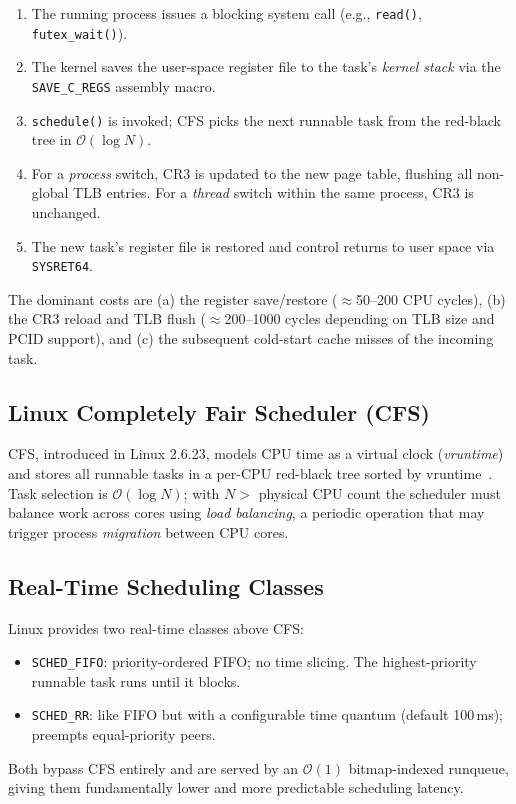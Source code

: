 \documentclass[conference]{IEEEtran}
\begin{document}
\begin{enumerate}
  \item The running process issues a blocking system call
        (e.g., \texttt{read()}, \texttt{futex\_wait()}).
  \item The kernel saves the user-space register file to the
        task's \emph{kernel stack} via the \texttt{SAVE\_C\_REGS}
        assembly macro.
  \item \texttt{schedule()} is invoked; CFS picks the next
        runnable task from the red-black tree in $\mathcal{O}(\log N)$.
  \item For a \emph{process} switch, CR3 is updated to the new
        page table, flushing all non-global TLB entries.
        For a \emph{thread} switch within the same process, CR3
        is unchanged.
  \item The new task's register file is restored and control
        returns to user space via \texttt{SYSRET64}.
\end{enumerate}

The dominant costs are (a) the register save/restore
($\approx$50–200 CPU cycles), (b) the CR3 reload and TLB flush
($\approx$200–1000 cycles depending on TLB size and PCID support),
and (c) the subsequent cold-start cache misses of the incoming task.

\subsection{Linux Completely Fair Scheduler (CFS)}

CFS, introduced in Linux 2.6.23, models CPU time as a virtual clock
(\emph{vruntime}) and stores all runnable tasks in a per-CPU red-black
tree sorted by vruntime~\cite{love2010linux}.  Task selection is
$\mathcal{O}(\log N)$; with $N > $ physical CPU count the scheduler
must balance work across cores using \emph{load balancing}, a
periodic operation that may trigger process \emph{migration} between
CPU cores.

\subsection{Real-Time Scheduling Classes}

Linux provides two real-time classes above CFS:
\begin{itemize}
  \item \texttt{SCHED\_FIFO}: priority-ordered FIFO; no time slicing.
        The highest-priority runnable task runs until it blocks.
  \item \texttt{SCHED\_RR}: like FIFO but with a configurable time
        quantum (default 100\,ms); preempts equal-priority peers.
\end{itemize}
Both bypass CFS entirely and are served by an $\mathcal{O}(1)$
bitmap-indexed runqueue, giving them fundamentally lower and more
predictable scheduling latency.
\end{document}
